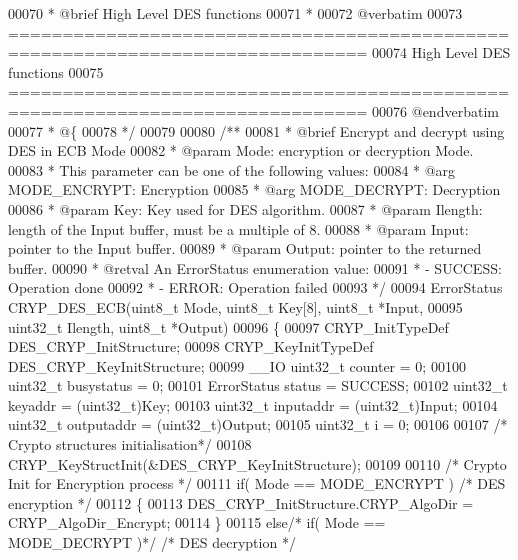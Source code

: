\begin{DoxyCode}
00070 \textcolor{comment}{ *  @brief   High Level DES functions }
00071 \textcolor{comment}{ *}
00072 \textcolor{comment}{@verbatim   }
00073 \textcolor{comment}{ ===============================================================================}
00074 \textcolor{comment}{                          High Level DES functions}
00075 \textcolor{comment}{ ===============================================================================}
00076 \textcolor{comment}{@endverbatim}
00077 \textcolor{comment}{  * @\{}
00078 \textcolor{comment}{  */}
00079 
00080 \textcolor{comment}{/**}
00081 \textcolor{comment}{  * @brief  Encrypt and decrypt using DES in ECB Mode}
00082 \textcolor{comment}{  * @param  Mode: encryption or decryption Mode.}
00083 \textcolor{comment}{  *           This parameter can be one of the following values:}
00084 \textcolor{comment}{  *            @arg MODE\_ENCRYPT: Encryption}
00085 \textcolor{comment}{  *            @arg MODE\_DECRYPT: Decryption}
00086 \textcolor{comment}{  * @param  Key: Key used for DES algorithm.}
00087 \textcolor{comment}{  * @param  Ilength: length of the Input buffer, must be a multiple of 8.}
00088 \textcolor{comment}{  * @param  Input: pointer to the Input buffer.}
00089 \textcolor{comment}{  * @param  Output: pointer to the returned buffer.}
00090 \textcolor{comment}{  * @retval An ErrorStatus enumeration value:}
00091 \textcolor{comment}{  *          - SUCCESS: Operation done}
00092 \textcolor{comment}{  *          - ERROR: Operation failed}
00093 \textcolor{comment}{  */}
00094 ErrorStatus CRYP_DES_ECB(uint8\_t Mode, uint8\_t Key[8], uint8\_t *Input,
00095                          uint32\_t Ilength, uint8\_t *Output)
00096 \{
00097   CRYP\_InitTypeDef DES\_CRYP\_InitStructure;
00098   CRYP\_KeyInitTypeDef DES\_CRYP\_KeyInitStructure;
00099   \_\_IO uint32\_t counter = 0;
00100   uint32\_t busystatus = 0;
00101   ErrorStatus status = SUCCESS;
00102   uint32\_t keyaddr    = (uint32\_t)Key;
00103   uint32\_t inputaddr  = (uint32\_t)Input;
00104   uint32\_t outputaddr = (uint32\_t)Output;
00105   uint32\_t i = 0;
00106 
00107   \textcolor{comment}{/* Crypto structures initialisation*/}
00108   CRYP_KeyStructInit(&DES\_CRYP\_KeyInitStructure);
00109 
00110   \textcolor{comment}{/* Crypto Init for Encryption process */}
00111   \textcolor{keywordflow}{if}( Mode == MODE_ENCRYPT ) \textcolor{comment}{/* DES encryption */}
00112   \{
00113      DES\_CRYP\_InitStructure.CRYP_AlgoDir  = CRYP_AlgoDir_Encrypt;
00114   \}
00115   \textcolor{keywordflow}{else}\textcolor{comment}{/* if( Mode == MODE\_DECRYPT )*/} \textcolor{comment}{/* DES decryption */}

\end{DoxyCode}
